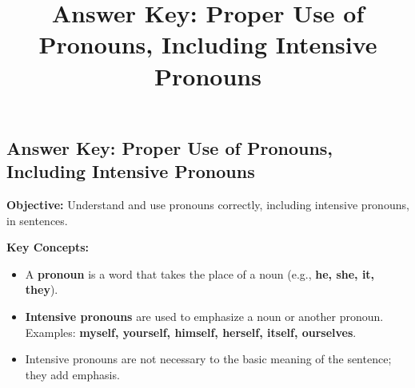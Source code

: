 \documentclass[12pt]{article}
\title{\textbf{Answer Key: Proper Use of Pronouns, Including Intensive Pronouns}}
\date{}
\begin{document}
\subsection*{Answer Key: Proper Use of Pronouns, Including Intensive Pronouns}
\onehalfspacing

\begin{tcolorbox}[colframe=black!40, colback=gray!5, 
coltitle=black, colbacktitle=black!20, fonttitle=\bfseries\Large, 
title=Learning Objective, halign title=center, left=5pt, right=5pt, top=5pt, bottom=15pt]
\textbf{Objective:} Understand and use pronouns correctly, including intensive pronouns, in sentences.
\end{tcolorbox}

\vspace{1em}

\begin{tcolorbox}[colframe=black!60, colback=white, 
coltitle=black, colbacktitle=black!15, fonttitle=\bfseries\Large, 
title=Key Concepts and Vocabulary, halign title=center, left=10pt, right=10pt, top=10pt, bottom=15pt]
\textbf{Key Concepts:}
\begin{itemize}
    \item A \textbf{pronoun} is a word that takes the place of a noun (e.g., \textbf{he, she, it, they}).
    \item \textbf{Intensive pronouns} are used to emphasize a noun or another pronoun. Examples: \textbf{myself, yourself, himself, herself, itself, ourselves}.
    \item Intensive pronouns are not necessary to the basic meaning of the sentence; they add emphasis.
\end{itemize}
\end{tcolorbox}

\vspace{1em}
\end{document}
